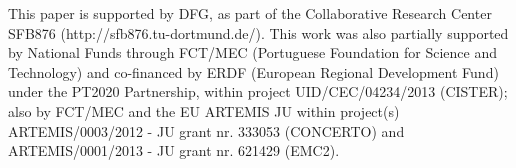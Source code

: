 \documentclass[conference]{IEEEtran}
\begin{document}
 This paper is supported by DFG, as part of the Collaborative Research Center SFB876 (http://sfb876.tu-dortmund.de/). This work was also partially supported by National Funds through FCT/MEC (Portuguese Foundation for Science and Technology) and co-financed by ERDF (European Regional Development Fund) under the PT2020 Partnership, within project UID/CEC/04234/2013 (CISTER); also by FCT/MEC and the EU ARTEMIS JU within project(s) ARTEMIS/0003/2012 - JU grant nr. 333053 (CONCERTO) and ARTEMIS/0001/2013 - JU grant nr. 621429 (EMC2).

{}


\end{document}
